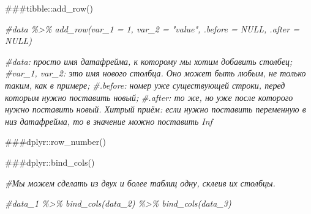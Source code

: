 \documentclass[
]{article}
\newenvironment{Shaded}{\begin{snugshade}}{\end{snugshade}}
\newcommand{\CommentTok}[1]{\textcolor[rgb]{0.56,0.35,0.01}{\textit{#1}}}
\begin{document}
\#\#\#tibble::add\_row()

\begin{Shaded}
\begin{Highlighting}[]
\CommentTok{\#data \%\textgreater{}\% add\_row(var\_1 = 1, var\_2 = "value", .before = NULL, .after = NULL)}

\CommentTok{\#data: просто имя датафрейма, к которому мы хотим добавить столбец;}
\CommentTok{\#var\_1, var\_2: это имя нового столбца. Оно может быть любым, не только таким, как в примере;}
\CommentTok{\#.before: номер уже существующей строки, перед которым нужно поставить новый;}
\CommentTok{\#.after: то же, но уже после которого нужно поставить новый. Хитрый приём: если нужно поставить переменную в низ датафрейма, то в значение можно поставить Inf}
\end{Highlighting}
\end{Shaded}

\#\#\#dplyr::row\_number()

\#\#\#dplyr::bind\_cols()

\begin{Shaded}
\begin{Highlighting}[]
\CommentTok{\#Мы можем сделать из двух и более таблиц одну, склеив их столбцы.}

\CommentTok{\#data\_1 \%\textgreater{}\% bind\_cols(data\_2) \%\textgreater{}\% bind\_cols(data\_3)}
\end{Highlighting}
\end{Shaded}
\end{document}
